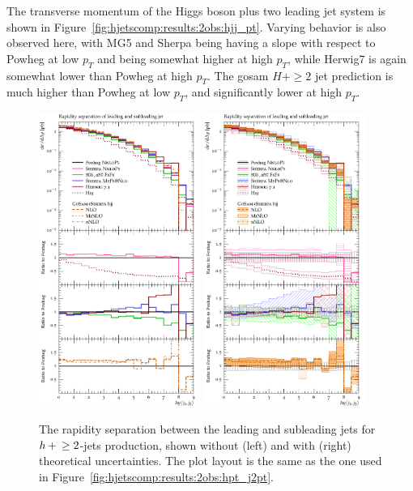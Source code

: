 The transverse momentum of the Higgs boson plus two leading jet system
is shown in Figure~\ref{fig:hjetscomp:results:2obs:hjj_pt}. Varying
behavior is also observed here, with MG5 and Sherpa being having a
slope with respect to Powheg at low $p_T$ and being somewhat higher at
high $p_T$, while Herwig7 is again somewhat lower than Powheg at high
$p_T$. The gosam $H+\ge2$ jet prediction is much higher than Powheg at
low $p_T$, and significantly lower at high $p_T$.


\begin{figure}[t!]
  \centering
  \includegraphics[width=0.47\textwidth]{figures/hjetscomp_u_deltay_jj.pdf}
  \hfill
  \includegraphics[width=0.47\textwidth]{figures/hjetscomp_deltay_jj.pdf}
  \caption{\label{fig:hjetscomp:results:2obs:dyjj}%
    The rapidity separation between the leading and subleading jets
    for $h\!\text{~+~}\!\ge2$-jets production, shown without (left) and with
    (right) theoretical uncertainties. The plot layout is the same as
    the one used in Figure~\ref{fig:hjetscomp:results:2obs:hpt_j2pt}.}
\end{figure}

